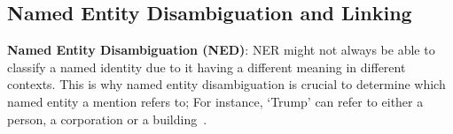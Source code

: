 

\subsection{Named Entity Disambiguation and Linking} \label{ned}

\textbf{Named Entity Disambiguation (NED)}: NER might not always be able to classify a named identity due to it having a different meaning in different contexts. This is why named entity disambiguation is crucial to determine which
named entity a mention refers to; For instance, `Trump' can refer to either a person, a corporation or a building~\cite{ieee_named_entity}.

